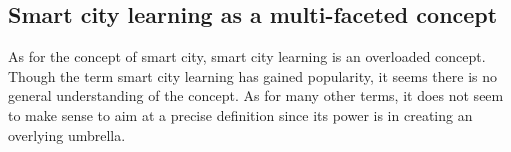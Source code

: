 

\subsection*{Smart city learning as a multi-faceted concept}
As for the concept of smart city, smart city learning is an overloaded concept. Though the term smart city learning has gained popularity, it seems there is no general understanding of the concept. As for many other terms, it does not seem to make sense to aim at a precise definition since its power is in creating an overlying umbrella.


